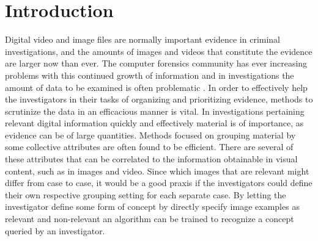 \chapter{Introduction}
\label{chapter:intro}

Digital video and image files are normally important evidence in criminal investigations, and the amounts of images and videos that constitute the evidence are larger now than ever. The computer forensics community has ever increasing problems with this continued growth of information and in investigations the amount of data to be examined is often problematic \cite{dhs2011}\cite{proc2009forensics}\cite{proc2010forensics}. In order to effectively help the investigators in their tasks of organizing and prioritizing evidence, methods to scrutinize the data in an efficacious manner is vital. In investigations pertaining relevant digital information quickly and effectively material is of importance, as evidence can be of large quantities. Methods focused on grouping material by some collective attributes are often found to be efficient. There are several of these attributes that can be correlated to the information obtainable in visual content, such as in images and video. Since which images that are relevant might differ from case to case, it would be a good praxis if the investigators could define their own respective grouping setting for each separate case. By letting the investigator define some form of concept by directly specify image examples as relevant and non-relevant an algorithm can be trained to recognize a concept queried by an investigator.

